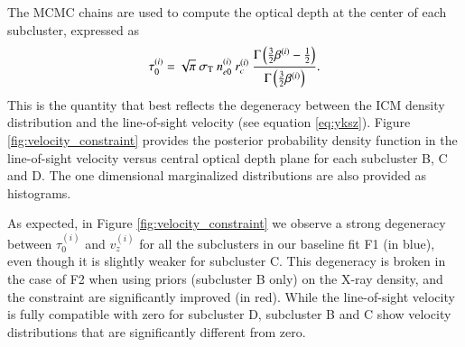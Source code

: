 \documentclass[twocolumn,traditabstract]{aa}
\begin{document}
The MCMC chains are used to compute the optical depth at the center of each subcluster, expressed as
\begin{equation}
\tau_0^{(i)} = \sqrt{\pi} \ \sigma_{\rm T} \ n_{e0}^{(i)} \ r_c^{(i)} \ \frac{\Gamma\left(\frac{3}{2} \beta^{(i)} -\frac{1}{2}\right)}{\Gamma\left(\frac{3}{2} \beta^{(i)}\right)}.
\label{eq:tau0}
\end{equation}
This is the quantity that best reflects the degeneracy between the ICM density distribution and the line-of-sight velocity (see equation \ref{eq:yksz}). Figure \ref{fig:velocity_constraint} provides the posterior probability density function in the line-of-sight velocity versus central optical depth plane for each subcluster B, C and D. The one dimensional marginalized distributions are also provided as histograms. 

As expected, in Figure \ref{fig:velocity_constraint} we observe a strong degeneracy between $\tau_0^{(i)}$ and $v_z^{(i)}$ for all the subclusters in our baseline fit F1 (in blue), even though it is slightly weaker for subcluster C. This degeneracy is broken in the case of F2 when using priors (subcluster B only) on the X-ray density, and the constraint are significantly improved (in red). While the line-of-sight velocity is fully compatible with zero for subcluster D, subcluster B and C show velocity distributions that are significantly different from zero.
\end{document}

